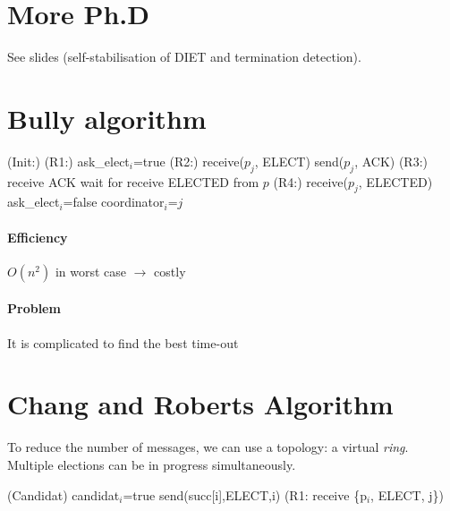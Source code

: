 \documentclass{article}
\begin{document}
\section{More Ph.D}
See slides (self-stabilisation of DIET and termination detection).

\section{Bully algorithm}

\begin{algorithm}
\Begin(Init:){
}
\Begin(R1:){
	ask\_elect$_i$=true\;
}
\Begin(R2:){
	receive($p_j$, ELECT)\;
	send($p_j$, ACK)\;
}
\Begin(R3:){
	receive ACK\;
	wait for receive ELECTED from $p$\;
}
\Begin(R4:){
	receive($p_j$, ELECTED)\;
	ask\_elect$_i$=false\;
	coordinator$_i$=$j$\;
}
\end{algorithm}

\paragraph{Efficiency}
$O(n^2)$ in worst case $\to$ costly

\paragraph{Problem} It is complicated to find the best time-out

\clearpage



\section{Chang and Roberts Algorithm}
To reduce the number of messages, we can use a topology: a virtual \emph{ring}. Multiple elections can be in progress simultaneously.


\begin{algorithm}
\Begin(Candidat){
	candidat$_{i}$=true\;
	send(succ[i],ELECT,i)\;
}
\Begin(R1: receive \{p$_i$, ELECT, j\}){
}
\end{algorithm}
\end{document}
